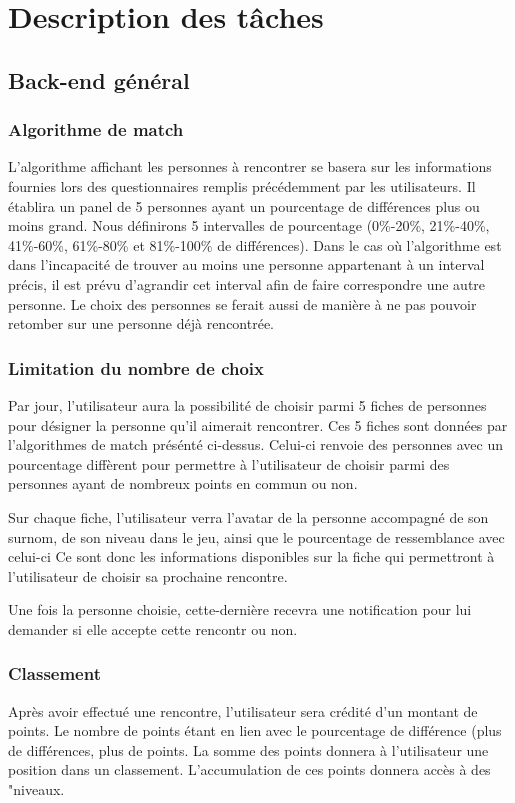 \documentclass[10pt]{article}
\begin{document}
 \section{Description des tâches} 
   
  \subsection{Back-end général}
   \subsubsection{Algorithme de match}
    L’algorithme affichant les personnes à rencontrer se basera sur les informations fournies lors des questionnaires remplis précédemment
    par les utilisateurs. 
    Il établira un panel de 5 personnes ayant un pourcentage de différences plus ou moins grand.
    Nous définirons 5 intervalles de pourcentage (0\%-20\%, 21\%-40\%, 41\%-60\%, 61\%-80\% et 81\%-100\% de différences).   
    Dans le cas où l’algorithme est dans l’incapacité de trouver au moins une personne appartenant à un interval précis,
    il est prévu d’agrandir cet interval afin de faire correspondre une autre personne.
    Le choix des personnes se ferait aussi de manière à ne pas pouvoir retomber sur une personne déjà rencontrée. 
   \subsubsection{Limitation du nombre de choix}
    Par jour, l'utilisateur aura la possibilité de choisir parmi 5 fiches de personnes pour désigner la personne qu'il aimerait rencontrer. 
    Ces 5 fiches sont données par l'algorithmes de match présénté ci-dessus. 
    Celui-ci renvoie des personnes avec un pourcentage diffèrent pour permettre à l'utilisateur de choisir parmi des personnes ayant de 
    nombreux points en commun ou non.    

    Sur chaque fiche, l'utilisateur verra l'avatar de la personne accompagné de son surnom, de son niveau dans le jeu, ainsi que le 
    pourcentage de ressemblance avec celui-ci  
    Ce sont donc les informations disponibles sur la fiche qui permettront à l'utilisateur de choisir sa prochaine rencontre.

    Une fois la personne choisie, cette-dernière recevra une notification pour lui demander si elle accepte cette rencontr ou non.
   \subsubsection{Classement}
    Après avoir effectué une rencontre, l'utilisateur sera crédité d'un montant de points. Le nombre de points étant en lien avec le
    pourcentage de différence (plus de différences, plus de points. La somme des points donnera à l'utilisateur une position dans 
    un classement. L'accumulation de ces points donnera accès à des "niveaux.
\end{document}
